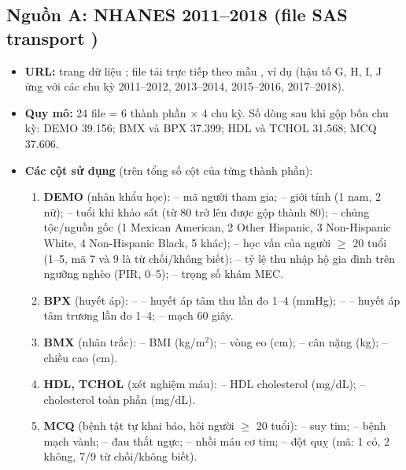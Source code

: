 \subsection{Nguồn A: NHANES 2011--2018 (file SAS transport )}
\begin{itemize}
\item \textbf{URL:} trang dữ liệu ; file tải trực tiếp theo mẫu , ví dụ  (hậu tố G, H, I, J ứng với các chu kỳ 2011--2012, 2013--2014, 2015--2016, 2017--2018).
\item \textbf{Quy mô:} 24 file = 6 thành phần $\times$ 4 chu kỳ. Số dòng sau khi gộp bốn chu kỳ: DEMO 39.156; BMX và BPX 37.399; HDL và TCHOL 31.568; MCQ 37.606.
\item \textbf{Các cột sử dụng} (trên tổng số cột của từng thành phần):
\begin{enumerate}
\item \textbf{DEMO} (nhân khẩu học):  -- mã người tham gia;  -- giới tính (1 nam, 2 nữ);  -- tuổi khi khảo sát (từ 80 trở lên được gộp thành 80);  -- chủng tộc/nguồn gốc (1 Mexican American, 2 Other Hispanic, 3 Non-Hispanic White, 4 Non-Hispanic Black, 5 khác);  -- học vấn của người $\geq$ 20 tuổi (1--5, mã 7 và 9 là từ chối/không biết);  -- tỷ lệ thu nhập hộ gia đình trên ngưỡng nghèo (PIR, 0--5);  -- trọng số khám MEC.
\item \textbf{BPX} (huyết áp): -- -- huyết áp tâm thu lần đo 1--4 (mmHg); -- -- huyết áp tâm trương lần đo 1--4;  -- mạch 60 giây.
\item \textbf{BMX} (nhân trắc):  -- BMI (kg/m$^2$);  -- vòng eo (cm);  -- cân nặng (kg);  -- chiều cao (cm).
\item \textbf{HDL, TCHOL} (xét nghiệm máu):  -- HDL cholesterol (mg/dL);  -- cholesterol toàn phần (mg/dL).
\item \textbf{MCQ} (bệnh tật tự khai báo, hỏi người $\geq$ 20 tuổi):  -- suy tim;  -- bệnh mạch vành;  -- đau thắt ngực;  -- nhồi máu cơ tim;  -- đột quỵ (mã: 1 có, 2 không, 7/9 từ chối/không biết).
\end{enumerate}
\end{itemize}


